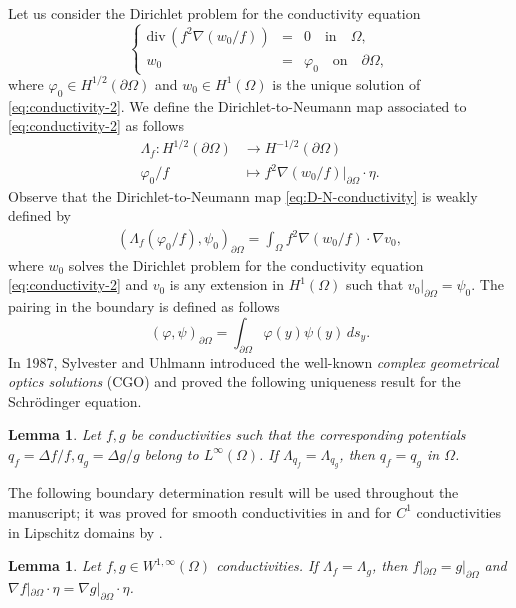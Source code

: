 \documentclass[12pt]{article}
\newtheorem{lemma}[theorem]{Lemma}
\def\div{\mbox{div}\,}
\begin{document}
Let us consider the Dirichlet problem for the conductivity equation
\begin{equation}\label{eq:conductivity-2}
	\left\{
\begin{array}{rclll}
\div\left(f^2\nabla(w_0/f)\right)&=& 0 \quad \mbox{in}\quad \Omega,\\
w_0&=&\varphi_0\quad \mbox {on}\quad \partial\Omega,
\end{array}
\right. 
\end{equation}
where $\varphi_0\in H^{1/2}(\partial\Omega)$ and $w_0\in H^1(\Omega)$ is the unique solution of \eqref{eq:conductivity-2}. We define the Dirichlet-to-Neumann map associated to \eqref{eq:conductivity-2} as follows
\begin{align}\label{eq:D-N-conductivity}
\nonumber    \Lambda_{f}\colon H^{1/2}(\partial\Omega) &\to H^{-1/2}(\partial\Omega)\\
    \varphi_0/f &\mapsto f^2\nabla (w_0/f)|_{\partial\Omega}\cdot \eta.
\end{align}
 Observe that the Dirichlet-to-Neumann map \eqref{eq:D-N-conductivity} is weakly defined by
\begin{align}\label{eq:weakly-D-N}
(\Lambda_f(\varphi_0/f),\psi_0)_{\partial\Omega}=\int_{\Omega} f^2 \nabla(w_0/f)\cdot \nabla v_0,
\end{align}
where $w_0$ solves the Dirichlet problem for the conductivity equation \eqref{eq:conductivity-2} and $v_0$ is any extension in $H^1(\Omega)$ such that $v_0|_{\partial\Omega}=\psi_0$.
The pairing in the boundary is defined as follows
\[
(\varphi,\psi)_{\partial\Omega}=\int_{\partial\Omega} \varphi(y) \psi(y)\, ds_y.
\]
In 1987, Sylvester and Uhlmann introduced the well-known \textit{complex geometrical optics solutions} (CGO) and proved the following uniqueness result for the Schr\"{o}dinger equation.
\begin{lemma}\label{lemma:uniqueness-potentials}
\cite{Sylvester-Uhlmann} Let $f, g$ be conductivities such that the corresponding potentials $q_f=\Delta f/f, q_g=\Delta g/g$ belong to $L^{\infty}(\Omega)$. If $\Lambda_{q_f}=\Lambda_{q_g}$, then $q_f=q_g$ in $\Omega$.
\end{lemma}
The following boundary determination result will be used throughout the manuscript; it was proved for smooth conductivities in \cite{Vogelius} and for $C^1$ conductivities in Lipschitz domains by \cite{Alessandrini}. 
\begin{lemma}\label{lemma:boundary}\cite{Alessandrini, Vogelius, Sylvester-Uhlmann-1988}
    Let $f, g\in W^{1,\infty}(\Omega)$ conductivities. If $\Lambda_f=\Lambda_g$, then $f|_{\partial\Omega}=g|_{\partial\Omega}$ and $\nabla f|_{\partial\Omega}\cdot \eta=\nabla g|_{\partial\Omega}\cdot \eta$.
\end{lemma}
\end{document}
